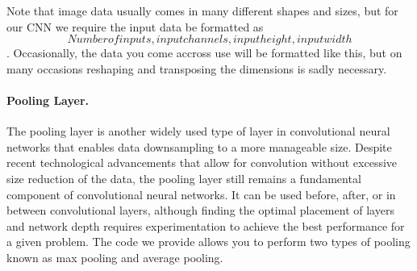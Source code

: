 \documentclass[%
oneside,                 %
final,                   %
10pt]{article}
\begin{document}
Note that image data usually comes in many different shapes and sizes,
but for our CNN we require the input data be formatted as \[Number of
inputs, input channels, input height, input width\]. Occasionally, the
data you come accross use will be formatted like this, but on many
occasions reshaping and transposing the dimensions is sadly necessary.

\paragraph{Pooling Layer.}
The pooling layer is another widely used type of layer in
convolutional neural networks that enables data downsampling to a more
manageable size. Despite recent technological advancements that allow
for convolution without excessive size reduction of the data, the
pooling layer still remains a fundamental component of convolutional
neural networks. It can be used before, after, or in between
convolutional layers, although finding the optimal placement of layers
and network depth requires experimentation to achieve the best
performance for a given problem. The code we provide allows you to
perform two types of pooling known as max pooling and average pooling.
\end{document}
